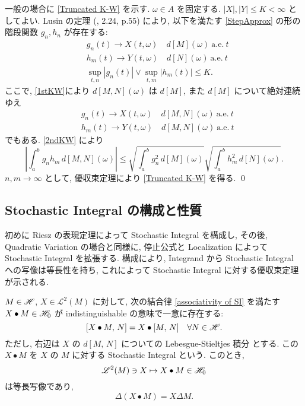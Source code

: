 \documentclass{ltjsarticle}
\begin{document}
\begin{prf}
	一般の場合に \eqref{Truncated K-W} を示す.
	\( \omega \in A \) を固定する.
	\( | X |, | Y | \le K < \infty \) としてよい.
	Lusin の定理 (\cite{Rudin:real-and-complex}, 2.24, p.55) により, 以下を満たす \eqref{StepApprox} の形の階段関数 \( g_n, h_n \) が存在する:
	\begin{align*}
		 & g_n(t)	\to	X(t,\omega)	\quad d[M](\omega) \ \mathrm{a.e.} \ t
		\\
		 & h_m(t)	\to	Y(t,\omega)	\quad d[N](\omega) \ \mathrm{a.e.} \ t
		\\
		 & \sup_{t,n} \left|g_n(t) \right| \vee \sup_{t,m} \left|h_m(t) \right|	\le K.
	\end{align*}
	ここで, \eqref{1stKW}により \( d[M,N](\omega) \) は \( d[M] \), また \( d[M] \) について絶対連続ゆえ
	\begin{align*}
		 & g_n(t)	\to	X(t,\omega)	\quad d[M,N](\omega) \ \mathrm{a.e.} \ t
		\\
		 & h_m(t)	\to	Y(t,\omega)	\quad d[M,N](\omega) \ \mathrm{a.e.} \ t
	\end{align*}
	でもある.
	\eqref{2ndKW} により
	\[
		\left| \int_a^b g_n h_m \, d[M,N](\omega) \right| \le 
		\sqrt{ \int_a^b g_n^2\,d[M](\omega) }\sqrt{ \int_a^b h_m^2\, d[N](\omega) }.
	\]
	\( n,m \to \infty \) として, 優収束定理により \eqref{Truncated K-W} を得る.
	\qed\end{prf}

\subsection{Stochastic Integral の構成と性質}
初めに Riesz の表現定理によって Stochastic Integral を構成し, その後, Quadratic Variation の場合と同様に, 停止公式と Localization によって Stochastic Integral を拡張する.
構成により, Integrand から Stochastic Integral への写像は等長性を持ち, これによって Stochastic Integral に対する優収束定理が示される.

\begin{thm}	\label{construction of first SI}
	\( M \in \mathscr{H} \), \( X \in \mathscr{L}^2 (M) \) に対して, 次の結合律 \eqref{associativity of SI} を満たす \( X \bullet M \in \mathscr{H}_0 \) が indistinguishable の意味で一意に存在する:
	\begin{equation} \label{associativity of SI}
		[ X \bullet M,\, N ] = X \bullet [M,\,N]	\quad \forall N \in \mathscr{H}.
	\end{equation}
	ただし, 右辺は \( X \) の \( d[M,\,N] \) についての Lebesgue-Stieltjes 積分 とする.
	この \( X \bullet M \) を \( X \) の \( M \) に対する Stochastic Integral という.
	このとき, 
	\begin{equation}		\label{Isometry of first SI}
		\mathscr{L}^2 (M) \ni X \mapsto X \bullet M \in \mathscr{H}_0
	\end{equation}
	は等長写像であり, 
	\begin{equation} \label{Jump rule for first SI}
		\Delta ( X \bullet M ) = X \Delta M.
	\end{equation}
\end{thm}
\end{document}
